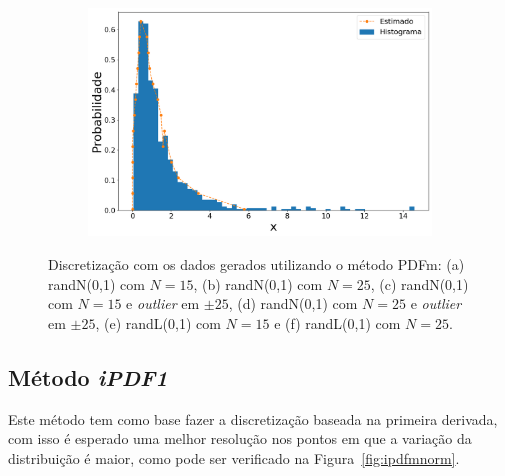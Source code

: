 \begin{figure}[H]
\begin{subfigure}[b]{0.45\textwidth}
		\includegraphics[width=\linewidth]{./figuras/PDFm_lognormal_25_1000_0}
		\caption{}
		\label{fig:pdfm_lognorm25_data}
	\end{subfigure}
	\caption{Discretização com os dados gerados utilizando o método \ac{PDFm}: (a) randN(0,1) com $N = 15$, (b) randN(0,1) com $N = 25$, (c) randN(0,1) com $N = 15$ e \textit{outlier} em $\pm 25$, (d) randN(0,1) com $N = 25$ e \textit{outlier} em $\pm 25$, (e) randL(0,1) com $ N = 15 $ e (f) randL(0,1) com $ N = 25 $.}
	\label{fig:pdfm_data}
\end{figure}

\subsection{Método \textit{iPDF1}}

Este método tem como base fazer a discretização baseada na primeira derivada, com isso é esperado uma melhor resolução nos pontos em que a variação da distribuição é maior, como pode ser verificado na Figura~\ref{fig:ipdfmnorm}.%

